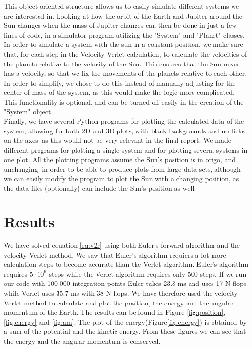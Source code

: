 \documentclass{article}
\begin{document}
    This object oriented structure allows us to easily simulate different systems we are interested in. Looking at how the orbit of the Earth and Jupiter around the Sun changes when the mass of Jupiter changes can then be done in just a few lines of code, in a simulator program utilizing the "System" and "Planet" classes.\\

    In order to simulate a system with the sun in a constant position, we make sure that, for each step in the Velocity Verlet calculation, to calculate the velocities of the planets relative to the velocity of the Sun. This ensures that the Sun never has a velocity, so that we fix the movements of the planets relative to each other. In order to simplify, we chose to do this instead of manually adjusting for the center of mass of the system, as this would make the logic more complicated. This functionality is optional, and can be turned off easily in the creation of the "System" object.\\

    Finally, we have several Python programs for plotting the calculated data of the system, allowing for both 2D and 3D plots, with black backgrounds and no ticks on the axes, as this would not be very relevant in the final report. We made different programs for plotting a single system and for plotting several systems in one plot. All the plotting programs assume the Sun's position is in origo, and unchanging, in order to be able to produce plots from large data sets, although we can easily modify the program to plot the Sun with a changing position, as the data files (optionally) can include the Sun's position as well.


\section{Results}
We have solved equation \ref{eq:v2r} using both Euler's forward algorithm and the velocity Verlet method. We saw that Euler's algorithm requiers a lot more calculation steps to become accurate than the Verlet algorithm. Euler's algorithm requires $5 \cdot 10^6$ steps while the Verlet algorithm requires only 500 steps. If we run our code with 100 000 integration points Euler takes 23.8 ms and uses 17 N flops while Verlet uses 35.7 ms with 38 N flops. We have therefore used the velocity Verlet method to calculate and plot the position, the energy and the angular momentum of the Earth. The results can be found in Figure \ref{fig:position}, \ref{fig:energy} and \ref{fig:am}. The plot of the energy(Figure\ref{fig:energy}) is obtained by a sum of the potential and the kinetic energy. From these figures we can see that the energy and the angular momentum is conserved.
\end{document}
